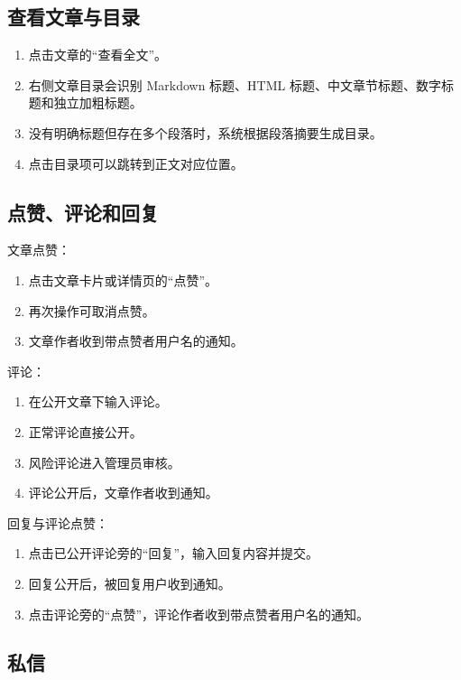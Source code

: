 \documentclass[UTF8,a4paper,12pt]{ctexart}
\begin{document}
\subsection{查看文章与目录}

\begin{enumerate}
  \item 点击文章的“查看全文”。
  \item 右侧文章目录会识别 Markdown 标题、HTML 标题、中文章节标题、数字标题和独立加粗标题。
  \item 没有明确标题但存在多个段落时，系统根据段落摘要生成目录。
  \item 点击目录项可以跳转到正文对应位置。
\end{enumerate}

\subsection{点赞、评论和回复}

文章点赞：

\begin{enumerate}
  \item 点击文章卡片或详情页的“点赞”。
  \item 再次操作可取消点赞。
  \item 文章作者收到带点赞者用户名的通知。
\end{enumerate}

评论：

\begin{enumerate}
  \item 在公开文章下输入评论。
  \item 正常评论直接公开。
  \item 风险评论进入管理员审核。
  \item 评论公开后，文章作者收到通知。
\end{enumerate}

回复与评论点赞：

\begin{enumerate}
  \item 点击已公开评论旁的“回复”，输入回复内容并提交。
  \item 回复公开后，被回复用户收到通知。
  \item 点击评论旁的“点赞”，评论作者收到带点赞者用户名的通知。
\end{enumerate}

\subsection{私信}
\end{document}
